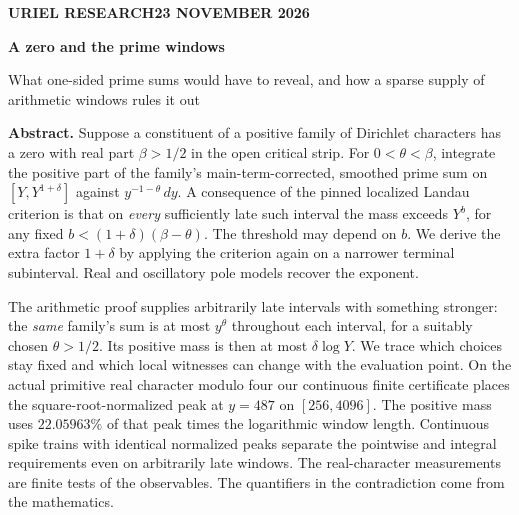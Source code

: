 \documentclass[12pt,letterpaper]{article}
\begin{document}
\thispagestyle{plain}
{\sffamily\small\bfseries\color{accent}URIEL RESEARCH\hfill 23 NOVEMBER 2026}\par\vspace{14pt}
{\Huge\bfseries\color{ink}A zero and the prime windows\par}\vspace{6pt}
{\Large\color{muted}What one-sided prime sums would have to reveal, and how a sparse supply of arithmetic windows rules it out\par}\vspace{13pt}
\textbf{Abstract.} Suppose a constituent of a positive family of Dirichlet characters has a zero with real part \(\beta>1/2\) in the open critical strip. For \(0<\theta<\beta\), integrate the positive part of the family's main-term-corrected, smoothed prime sum on \([Y,Y^{1+\delta}]\) against \(y^{-1-\theta}\,dy\). A consequence of the pinned localized Landau criterion is that on \emph{every} sufficiently late such interval the mass exceeds \(Y^b\), for any fixed \(b<(1+\delta)(\beta-\theta)\). The threshold may depend on \(b\). We derive the extra factor \(1+\delta\) by applying the criterion again on a narrower terminal subinterval. Real and oscillatory pole models recover the exponent.

The arithmetic proof supplies arbitrarily late intervals with something stronger: the \emph{same} family's sum is at most \(y^\theta\) throughout each interval, for a suitably chosen \(\theta>1/2\). Its positive mass is then at most \(\delta\log Y\). We trace which choices stay fixed and which local witnesses can change with the evaluation point. On the actual primitive real character modulo four our continuous finite certificate places the square-root-normalized peak at \(y=487\) on \([256,4096]\). The positive mass uses \(22.05963\%\) of that peak times the logarithmic window length. Continuous spike trains with identical normalized peaks separate the pointwise and integral requirements even on arbitrarily late windows. The real-character measurements are finite tests of the observables. The quantifiers in the contradiction come from the mathematics.
\end{document}
